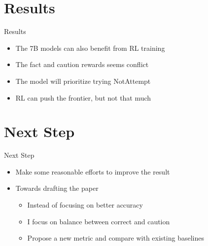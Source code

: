 \documentclass[aspectratio=169]{beamer}
\begin{document}
\section{Results}
\begin{frame}{Results}
    \begin{itemize}
        \item The 7B models can also benefit from RL training
        \item The fact and caution rewards seems conflict
        \item The model will prioritize trying NotAttempt
        \item RL can push the frontier, but not that much
    \end{itemize}
\end{frame}

\section{Next Step}
\begin{frame}{Next Step}
    \begin{itemize}
        \item Make some reasonable efforts to improve the result
        \item Towards drafting the paper
        \begin{itemize}
            \item Instead of focusing on better accuracy
            \item I focus on balance between correct and caution
            \item Propose a new metric and compare with existing baselines
        \end{itemize}
    \end{itemize}
\end{frame}
\end{document}
